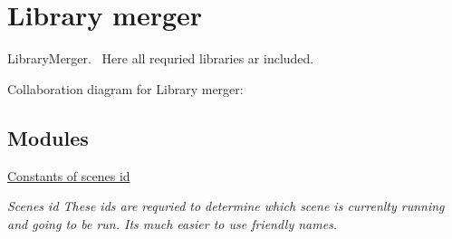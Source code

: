 \hypertarget{group___library_merger}{}\section{Library merger}
\label{group___library_merger}


Library\+Merger.~\newline
 Here all requried libraries ar included.  


Collaboration diagram for Library merger\+:
\subsection*{Modules}
\begin{DoxyCompactItemize}
\item 
\hyperlink{group___c}{Constants of scenes id}
\begin{DoxyCompactList}\small\item\em Scenes id These ids are requried to determine which scene is currenlty running and going to be run. It\textquotesingle{}s much easier to use friendly names. \end{DoxyCompactList}\end{DoxyCompactItemize}
